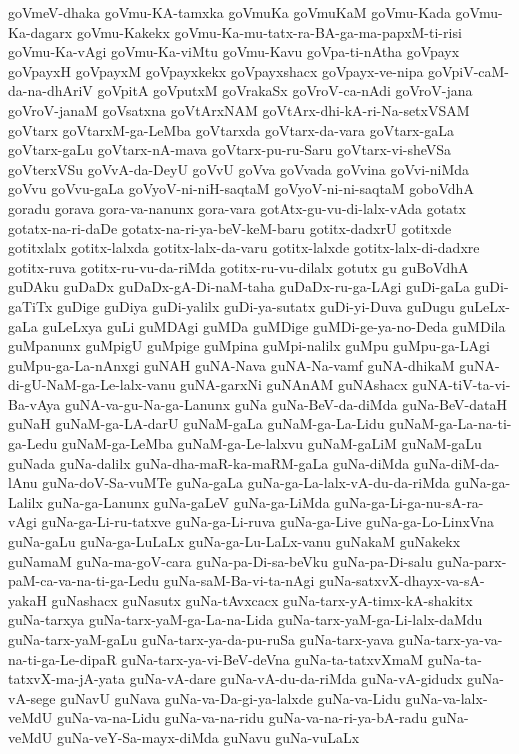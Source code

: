 {goVmeV-dhaka
goVmu-KA-tamxka
goVmuKa
goVmuKaM
goVmu-Kada
goVmu-Ka-dagarx
goVmu-Kakekx
goVmu-Ka-mu-tatx-ra-BA-ga-ma-papxM-ti-risi
goVmu-Ka-vAgi
goVmu-Ka-viMtu
goVmu-Kavu
goVpa-ti-nAtha
goVpayx
goVpayxH
goVpayxM
goVpayxkekx
goVpayxshacx
goVpayx-ve-nipa
goVpiV-caM-da-na-dhAriV
goVpitA
goVputxM
goVrakaSx
goVroV-ca-nAdi
goVroV-jana
goVroV-janaM
goVsatxna
goVtArxNAM
goVtArx-dhi-kA-ri-Na-setxVSAM
goVtarx
goVtarxM-ga-LeMba
goVtarxda
goVtarx-da-vara
goVtarx-gaLa
goVtarx-gaLu
goVtarx-nA-mava
goVtarx-pu-ru-Saru
goVtarx-vi-sheVSa
goVterxVSu
goVvA-da-DeyU
goVvU
goVva
goVvada
goVvina
goVvi-niMda
goVvu
goVvu-gaLa
goVyoV-ni-niH-saqtaM
goVyoV-ni-ni-saqtaM
goboVdhA
goradu
gorava
gora-va-nanunx
gora-vara
gotAtx-gu-vu-di-lalx-vAda
gotatx
gotatx-na-ri-daDe
gotatx-na-ri-ya-beV-keM-baru
gotitx-dadxrU
gotitxde
gotitxlalx
gotitx-lalxda
gotitx-lalx-da-varu
gotitx-lalxde
gotitx-lalx-di-dadxre
gotitx-ruva
gotitx-ru-vu-da-riMda
gotitx-ru-vu-dilalx
gotutx
gu
guBoVdhA
guDAku
guDaDx
guDaDx-gA-Di-naM-taha
guDaDx-ru-ga-LAgi
guDi-gaLa
guDi-gaTiTx
guDige
guDiya
guDi-yalilx
guDi-ya-sutatx
guDi-yi-Duva
guDugu
guLeLx-gaLa
guLeLxya
guLi
guMDAgi
guMDa
guMDige
guMDi-ge-ya-no-Deda
guMDila
guMpanunx
guMpigU
guMpige
guMpina
guMpi-nalilx
guMpu
guMpu-ga-LAgi
guMpu-ga-La-nAnxgi
guNAH
guNA-Nava
guNA-Na-vamf
guNA-dhikaM
guNA-di-gU-NaM-ga-Le-lalx-vanu
guNA-garxNi
guNAnAM
guNAshacx
guNA-tiV-ta-vi-Ba-vAya
guNA-va-gu-Na-ga-Lanunx
guNa
guNa-BeV-da-diMda
guNa-BeV-dataH
guNaH
guNaM-ga-LA-darU
guNaM-gaLa
guNaM-ga-La-Lidu
guNaM-ga-La-na-ti-ga-Ledu
guNaM-ga-LeMba
guNaM-ga-Le-lalxvu
guNaM-gaLiM
guNaM-gaLu
guNada
guNa-dalilx
guNa-dha-maR-ka-maRM-gaLa
guNa-diMda
guNa-diM-da-lAnu
guNa-doV-Sa-vuMTe
guNa-gaLa
guNa-ga-La-lalx-vA-du-da-riMda
guNa-ga-Lalilx
guNa-ga-Lanunx
guNa-gaLeV
guNa-ga-LiMda
guNa-ga-Li-ga-nu-sA-ra-vAgi
guNa-ga-Li-ru-tatxve
guNa-ga-Li-ruva
guNa-ga-Live
guNa-ga-Lo-LinxVna
guNa-gaLu
guNa-ga-LuLaLx
guNa-ga-Lu-LaLx-vanu
guNakaM
guNakekx
guNamaM
guNa-ma-goV-cara
guNa-pa-Di-sa-beVku
guNa-pa-Di-salu
guNa-parx-paM-ca-va-na-ti-ga-Ledu
guNa-saM-Ba-vi-ta-nAgi
guNa-satxvX-dhayx-va-sA-yakaH
guNashacx
guNasutx
guNa-tAvxcacx
guNa-tarx-yA-timx-kA-shakitx
guNa-tarxya
guNa-tarx-yaM-ga-La-na-Lida
guNa-tarx-yaM-ga-Li-lalx-daMdu
guNa-tarx-yaM-gaLu
guNa-tarx-ya-da-pu-ruSa
guNa-tarx-yava
guNa-tarx-ya-va-na-ti-ga-Le-dipaR
guNa-tarx-ya-vi-BeV-deVna
guNa-ta-tatxvXmaM
guNa-ta-tatxvX-ma-jA-yata
guNa-vA-dare
guNa-vA-du-da-riMda
guNa-vA-gidudx
guNa-vA-sege
guNavU
guNava
guNa-va-Da-gi-ya-lalxde
guNa-va-Lidu
guNa-va-lalx-veMdU
guNa-va-na-Lidu
guNa-va-na-ridu
guNa-va-na-ri-ya-bA-radu
guNa-veMdU
guNa-veY-Sa-mayx-diMda
guNavu
guNa-vuLaLx
}
